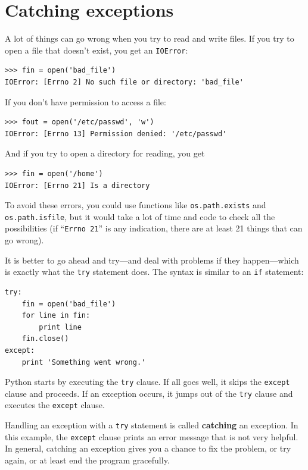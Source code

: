 \documentclass[10pt]{book}
\begin{document}
\section{Catching exceptions}
\label{catch}

A lot of things can go wrong when you try to read and write
files.  If you try to open a file that doesn't exist, you get an
{\tt IOError}:

\begin{verbatim}
>>> fin = open('bad_file')
IOError: [Errno 2] No such file or directory: 'bad_file'
\end{verbatim}
%
If you don't have permission to access a file:

\begin{verbatim}
>>> fout = open('/etc/passwd', 'w')
IOError: [Errno 13] Permission denied: '/etc/passwd'
\end{verbatim}
%
And if you try to open a directory for reading, you get

\begin{verbatim}
>>> fin = open('/home')
IOError: [Errno 21] Is a directory
\end{verbatim}
%
To avoid these errors, you could use functions like {\tt os.path.exists}
and {\tt os.path.isfile}, but it would take a lot of time and code
to check all the possibilities (if ``{\tt Errno 21}'' is any
indication, there are at least 21 things that can go wrong).

It is better to go ahead and try---and deal with problems if they
happen---which is exactly what the {\tt try} statement does.  The
syntax is similar to an {\tt if} statement:

\begin{verbatim}
try:    
    fin = open('bad_file')
    for line in fin:
        print line
    fin.close()
except:
    print 'Something went wrong.'
\end{verbatim}
%
Python starts by executing the {\tt try} clause.  If all goes
well, it skips the {\tt except} clause and proceeds.  If an
exception occurs, it jumps out of the {\tt try} clause and
executes the {\tt except} clause.

Handling an exception with a {\tt try} statement is called {\bf
catching} an exception.  In this example, the {\tt except} clause
prints an error message that is not very helpful.  In general,
catching an exception gives you a chance to fix the problem, or try
again, or at least end the program gracefully.
\end{document}
